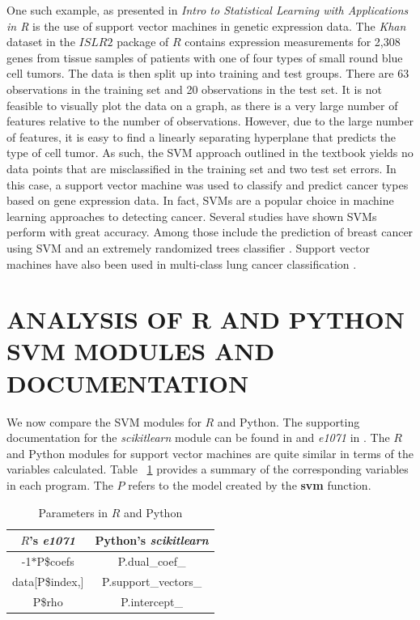 \documentclass[12pt]{article}
\begin{document}
One such example, as presented in \textit{Intro to Statistical Learning with Applications in R} \citep{introstatlearning} is the use of support vector machines in genetic expression data. The \textit{Khan} dataset in the $ISLR2$ package of $R$ contains expression measurements for 2,308 genes from tissue samples of patients with one of four types of small round blue cell tumors. The data is then split up into training and test groups. There are 63 observations in the training set and 20 observations in the test set. It is not feasible to visually plot the data on a graph, as there is a very large number of features relative to the number of observations. However, due to the large number of features, it is easy to find a linearly separating hyperplane that predicts the type of cell tumor. As such, the SVM approach outlined in the textbook yields no data points that are misclassified in the training set and two test set errors. In this case, a support vector machine was used to classify and predict cancer types based on gene expression data. In fact, SVMs are a popular choice in machine learning approaches to detecting cancer. Several studies have shown SVMs perform with great accuracy. Among those include the prediction of breast cancer using SVM and an extremely randomized trees classifier \cite{breastcancer}. Support vector machines have also been used in multi-class lung cancer classification \cite{lungcancer}.

\section{ANALYSIS OF R AND PYTHON SVM MODULES AND DOCUMENTATION}

We now compare the SVM modules for $R$ and Python. The supporting documentation for the \textit{scikitlearn} module can be found in \cite{scikit_svm} and \textit{e1071} in \cite{e1071}. The $R$ and Python modules for support vector machines are quite similar in terms of the variables calculated. Table ~\ref{tab_r_python} provides a summary of the corresponding variables in each program. The $P$ refers to the model created by the \textbf{svm} function. 

\begin{table}[H]
    \centering
    \def\arraystretch{1.5}
    \begin{tabular}{c|c}
        $R$'s \textit{e1071} & Python's \textit{scikitlearn} \\
        \hline
        -1$*$P\$coefs & P.dual\_coef\_ \\
        data[P\$index,] & P.support\_vectors\_ \\
        P\$rho & P.intercept\_
    \end{tabular}
    \caption{Parameters in $R$ and Python}
    \label{tab_r_python}
\end{table}
\end{document}
